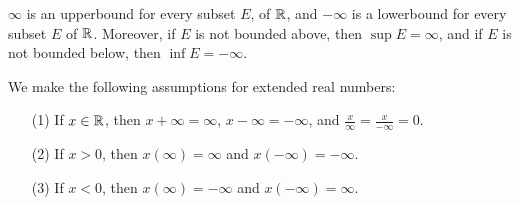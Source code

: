 \begin{lemma}\label{1.3.5}
    $\infty$ is an upperbound for every subset  $E$, of  $\mathbb{R}$, and  $-\infty$ is a lowerbound
    for every subset  $E$ of  $\mathbb{R}$. Moreover, if $E$ is not bounded above, then  $\sup{E}=\infty$,
    and if  $E$ is not bounded below, then  $\inf{E}=-\infty$.
\end{lemma}

\begin{remark}
    We make the following assumptions for extended real numbers:
        \begin{enumerate}
            \item[(1)] If $x \in \mathbb{R}$, then  $x+\infty=\infty$, $x-\infty=-\infty$,
                and $\frac{x}{\infty}=\frac{x}{-\infty}=0$.

            \item[(2)] If $x>0$, then  $x(\infty)=\infty$ and  $x(-\infty)=-\infty$.

            \item[(3)] If  $x<0$, then  $x(\infty)=-\infty$ and  $x(-\infty)=\infty$.
        \end{enumerate}
\end{remark}
